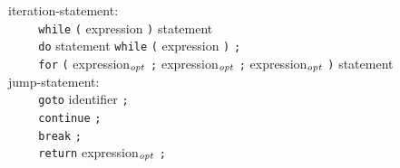 \documentclass[12pt]{report}
\def\|{\verb|}
\newcommand\opt{$_{{\it opt}}$ }
\begin{document}
\noindent
iteration-statement:\\
\|    | \verb+while+ \verb+(+ expression \verb+)+ statement\\
\|    | \verb+do+ statement \verb+while+ \verb+(+ expression \verb+)+ \verb+;+\\
\|    | \verb+for+ \verb+(+ expression\opt \verb+;+ expression\opt \verb+;+ expression\opt \verb+)+ statement\\

\noindent
jump-statement:\\
\|    | \verb+goto+ identifier \verb+;+\\
\|    | \verb+continue+ \verb+;+\\
\|    | \verb+break+ \verb+;+\\
\|    | \verb+return+ expression\opt \verb+;+\\
\end{document}
